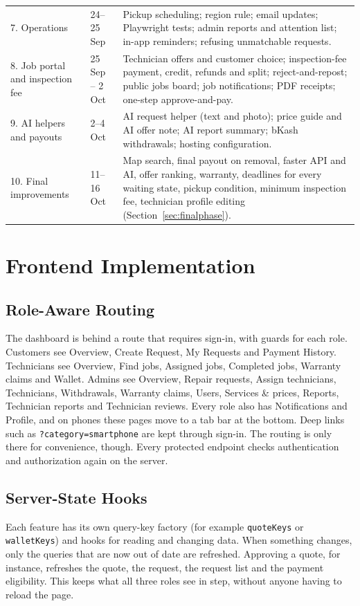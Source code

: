 \documentclass{standalone}
\begin{document}
\begin{longtable}{@{}p{3.2cm}p{2.2cm}p{8.8cm}@{}}
7. Operations & 24--25 Sep & Pickup scheduling; region rule; email updates; Playwright tests; admin reports and attention list; in-app reminders; refusing unmatchable requests. \\
8. Job portal and inspection fee & 25 Sep -- 2 Oct & Technician offers and customer choice; inspection-fee payment, credit, refunds and split; reject-and-repost; public jobs board; job notifications; PDF receipts; one-step approve-and-pay. \\
9. AI helpers and payouts & 2--4 Oct & AI request helper (text and photo); price guide and AI offer note; AI report summary; bKash withdrawals; hosting configuration. \\
10. Final improvements & 11--16 Oct & Map search, final payout on removal, faster API and AI, offer ranking, warranty, deadlines for every waiting state, pickup condition, minimum inspection fee, technician profile editing (Section~\ref{sec:finalphase}). \\
\end{longtable}

\section{Frontend Implementation}
\subsection{Role-Aware Routing}
The dashboard is behind a route that requires sign-in, with guards for each role. Customers see Overview, Create Request, My Requests and Payment History. Technicians see Overview, Find jobs, Assigned jobs, Completed jobs, Warranty claims and Wallet. Admins see Overview, Repair requests, Assign technicians, Technicians, Withdrawals, Warranty claims, Users, Services \& prices, Reports, Technician reports and Technician reviews. Every role also has Notifications and Profile, and on phones these pages move to a tab bar at the bottom. Deep links such as \texttt{?category=smartphone} are kept through sign-in. The routing is only there for convenience, though. Every protected endpoint checks authentication and authorization again on the server.

\subsection{Server-State Hooks}
Each feature has its own query-key factory (for example \texttt{quoteKeys} or \texttt{walletKeys}) and hooks for reading and changing data. When something changes, only the queries that are now out of date are refreshed. Approving a quote, for instance, refreshes the quote, the request, the request list and the payment eligibility. This keeps what all three roles see in step, without anyone having to reload the page.
\end{document}
